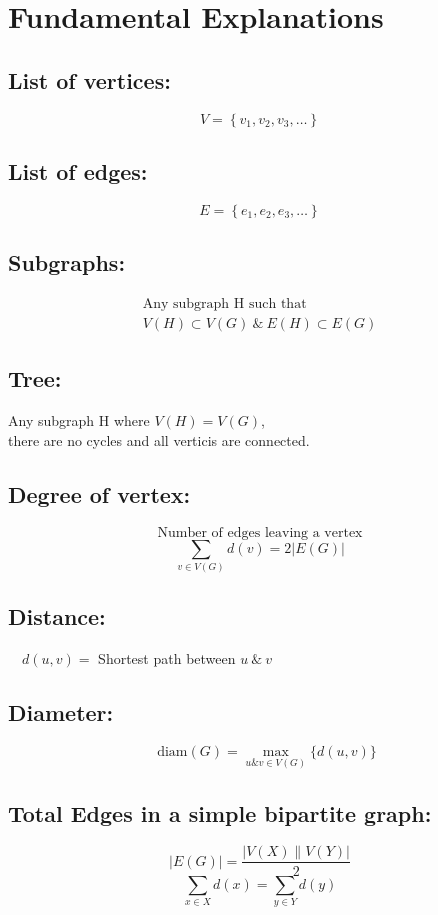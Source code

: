 
\section{Fundamental Explanations}

\subsection{List of vertices:}
$$
V=\left\{v_{1}, v_{2}, v_{3}, \ldots\right\}
$$
\subsection{List of edges:}
$$
E=\left\{e_{1}, e_{2}, e_{3}, \ldots\right\}
$$
\subsection{Subgraphs:}
$$
\begin{array}{cc}
\text{Any subgraph } \mathrm{H} \text{ such that}\\
V(H) \subset V(G) ~\&~ E(H) \subset E(G)
\end{array}
$$
\subsection{Tree:}
\begin{center}
Any subgraph $\mathrm{H}$ where $V(H)=V(G)$,\\ there are no cycles and all verticis are connected.
\end{center}
%
\subsection{Degree of vertex:}
$$\text{Number of edges leaving a vertex}$$
$$\sum_{v \in V(G)} d(v)=2|E(G)| $$
%
%
\subsection{Distance:}
\begin{center}
$\quad d(u, v)=$ Shortest path between $u ~\&~ v$
\end{center}
%
\subsection{Diameter:}
$$\quad \text{diam}(G)=\max _{u \& v \in V(G)}\{d(u, v)\}$$
%
\subsection{Total Edges in a simple bipartite graph:}
$$|E(G)|=\frac{|V(X) \| V(Y)|}{2} $$
$$\sum_{x \in X} d(x)=\sum_{y \in Y} d(y)$$
%
